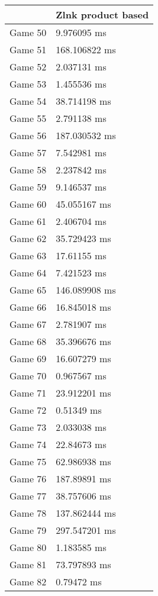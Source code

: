 \begin{multicols}{2}
\begin{tabular}{|l|l|}
	\hline
	& Zlnk product based \\ \hline
	Game 50 & 9.976095 ms \\ \hline
	Game 51 & 168.106822 ms \\ \hline
	Game 52 & 2.037131 ms \\ \hline
	Game 53 & 1.455536 ms \\ \hline
	Game 54 & 38.714198 ms \\ \hline
	Game 55 & 2.791138 ms \\ \hline
	Game 56 & 187.030532 ms \\ \hline
	Game 57 & 7.542981 ms \\ \hline
	Game 58 & 2.237842 ms \\ \hline
	Game 59 & 9.146537 ms \\ \hline
	Game 60 & 45.055167 ms \\ \hline
	Game 61 & 2.406704 ms \\ \hline
	Game 62 & 35.729423 ms \\ \hline
	Game 63 & 17.61155 ms \\ \hline
	Game 64 & 7.421523 ms \\ \hline
	Game 65 & 146.089908 ms \\ \hline
	Game 66 & 16.845018 ms \\ \hline
	Game 67 & 2.781907 ms \\ \hline
	Game 68 & 35.396676 ms \\ \hline
	Game 69 & 16.607279 ms \\ \hline
	Game 70 & 0.967567 ms \\ \hline
	Game 71 & 23.912201 ms \\ \hline
	Game 72 & 0.51349 ms \\ \hline
	Game 73 & 2.033038 ms \\ \hline
	Game 74 & 22.84673 ms \\ \hline
	Game 75 & 62.986938 ms \\ \hline
	Game 76 & 187.89891 ms \\ \hline
	Game 77 & 38.757606 ms \\ \hline
	Game 78 & 137.862444 ms \\ \hline
	Game 79 & 297.547201 ms \\ \hline
	Game 80 & 1.183585 ms \\ \hline
	Game 81 & 73.797893 ms \\ \hline
	Game 82 & 0.79472 ms \\ \hline

\end{tabular}
\end{multicols}
